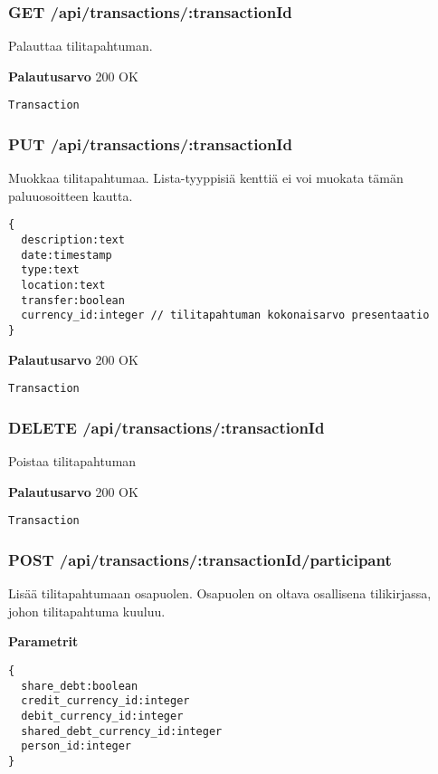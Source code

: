 \subsubsection{GET /api/transactions/:transactionId}

Palauttaa tilitapahtuman.

\textbf{Palautusarvo}
200 OK
\begin{Verbatim}
Transaction
\end{Verbatim}

\subsubsection{PUT /api/transactions/:transactionId}

Muokkaa tilitapahtumaa. Lista-tyyppisiä kenttiä ei voi muokata tämän
paluuosoitteen kautta.

\begin{Verbatim}
{
  description:text
  date:timestamp
  type:text
  location:text
  transfer:boolean
  currency_id:integer // tilitapahtuman kokonaisarvo presentaatio
}
\end{Verbatim}

\textbf{Palautusarvo}
200 OK
\begin{Verbatim}
Transaction
\end{Verbatim}

\subsubsection{DELETE /api/transactions/:transactionId}

Poistaa tilitapahtuman

\textbf{Palautusarvo}
200 OK
\begin{Verbatim}
Transaction
\end{Verbatim}

\subsubsection{POST /api/transactions/:transactionId/participant}

Lisää tilitapahtumaan osapuolen. Osapuolen on oltava osallisena tilikirjassa,
johon tilitapahtuma kuuluu.

\textbf{Parametrit}
\begin{Verbatim}
{
  share_debt:boolean
  credit_currency_id:integer
  debit_currency_id:integer
  shared_debt_currency_id:integer
  person_id:integer
}
\end{Verbatim}

